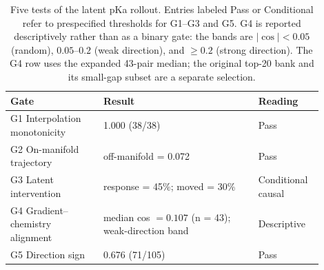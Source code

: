 \begin{table}[t]
\centering
\caption{Five tests of the latent pKa rollout. Entries labeled Pass or Conditional refer to prespecified thresholds for G1--G3 and G5. G4 is reported descriptively rather than as a binary gate: the bands are $|\cos|<0.05$ (random), $0.05$--$0.2$ (weak direction), and $\geq0.2$ (strong direction). The G4 row uses the expanded 43-pair median; the original top-20 bank and its small-gap subset are a separate selection.}
\label{tab:gates}
\small
\begin{tabular}{p{0.27\linewidth}p{0.45\linewidth}p{0.18\linewidth}}
\toprule
Gate & Result & Reading \\
\midrule
G1 Interpolation monotonicity & 1.000 (38/38) & Pass \\
G2 On-manifold trajectory & off-manifold = 0.072 & Pass \\
G3 Latent intervention & response = 45\%; moved = 30\% & Conditional causal \\
G4 Gradient--chemistry alignment & median cos $=0.107$ (n = 43); weak-direction band & Descriptive \\
G5 Direction sign & 0.676 (71/105) & Pass \\
\bottomrule
\end{tabular}
\end{table}
